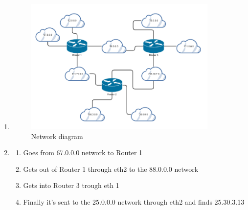 \documentclass{WeSTassignment}
\begin{document}
\begin{enumerate}
\item
	\begin{figure}[!hb]
  	\centering
  	\includegraphics[width=0.9\textwidth]{network_diagram.png}
   	\caption{Network diagram}
     \label{fig:network diagram}
	\end{figure}
\item 
	\begin{enumerate}
	\item Goes from 67.0.0.0 network to Router 1
	\item Gets out of Router 1 through eth2 to the 88.0.0.0 network
	\item Gets into Router 3 trough eth 1
	\item Finally it's sent to the 25.0.0.0 network through eth2 and finds 25.30.3.13
	\end{enumerate}
\end{enumerate}

\end{document}
